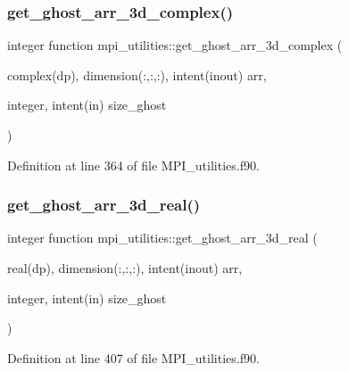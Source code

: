 \mbox{\label{namespacempi__utilities_a2212e8eedabb82df5c9d430fce6a0010}} 
\subsubsection{\texorpdfstring{get\+\_\+ghost\+\_\+arr\+\_\+3d\+\_\+complex()}{get\_ghost\_arr\_3d\_complex()}}
{\footnotesize\ttfamily integer function mpi\+\_\+utilities\+::get\+\_\+ghost\+\_\+arr\+\_\+3d\+\_\+complex (\begin{DoxyParamCaption}\item[{complex(dp), dimension(\+:,\+:,\+:), intent(inout)}]{arr,  }\item[{integer, intent(in)}]{size\+\_\+ghost }\end{DoxyParamCaption})}



Definition at line 364 of file M\+P\+I\+\_\+utilities.\+f90.

\mbox{\label{namespacempi__utilities_a01b9221fa05f573cb74027343aa8ff6b}} 
\subsubsection{\texorpdfstring{get\+\_\+ghost\+\_\+arr\+\_\+3d\+\_\+real()}{get\_ghost\_arr\_3d\_real()}}
{\footnotesize\ttfamily integer function mpi\+\_\+utilities\+::get\+\_\+ghost\+\_\+arr\+\_\+3d\+\_\+real (\begin{DoxyParamCaption}\item[{real(dp), dimension(\+:,\+:,\+:), intent(inout)}]{arr,  }\item[{integer, intent(in)}]{size\+\_\+ghost }\end{DoxyParamCaption})}



Definition at line 407 of file M\+P\+I\+\_\+utilities.\+f90.

